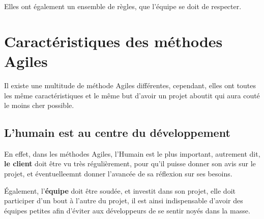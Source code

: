 		Elles ont également un ensemble de règles, que l'équipe se doit de respecter.
\newpage
	\section{Caractéristiques des méthodes Agiles}
		Il existe une multitude de méthode Agiles différentes, cependant, elles ont toutes les même caractéristiques et le même but d'avoir un projet aboutit qui aura couté le moins cher possible.
		\subsection{L'humain est au centre du développement} \label{client}
		En effet, dans les méthodes Agiles, l'Humain est le plus important, autrement dit,\textbf{ le client} doit être vu très régulièrement, pour qu'il puisse donner son avis sur le projet, et éventuelleemnt
		donner l'avancée de sa réflexion sur ses besoins.

		Également, l'\textbf{équipe} doit être soudée, et investit dans son projet, elle doit participer d'un bout à l'autre du projet, il est ainsi indispensable d'avoir des équipes petites afin d'éviter aux développeurs
		de se sentir noyés dans la masse.
